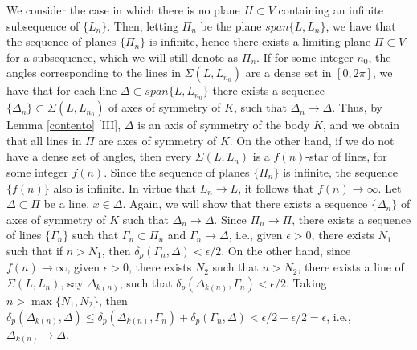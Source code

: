 \documentclass[12pt,thmsa]{amsart}
\begin{document}
 We consider the case in which there is no plane $H\subset V$ containing an infinite subsequence of $\{L_n\}$. Then, letting $\Pi_n$ be the plane $span\{L,L_{n}\}$, we have that the sequence of planes $\{\Pi_n\}$ is infinite, hence there exists a limiting plane $\Pi\subset V$ for a subsequence, which we will still denote as $\Pi_{n}$. If for some integer $n_0$, the angles corresponding to the lines in $\Sigma (L,L_{n_0})$ are a dense set in $[0,2\pi]$, we have that for each line $\Delta \subset span\{L,L_{n_0}\}$ there exists a sequence $\{\Delta_n\}\subset \Sigma (L,L_{n_0})$ of axes of symmetry of $K$, such that $\Delta_n \rightarrow \Delta$. Thus,  by Lemma \ref{contento} [III], $\Delta$ is an axis of symmetry of the body $K$, and we obtain that all lines in $\Pi$ are axes of symmetry of $K$. On the other hand, if we do not have a dense set of angles, then every  $\Sigma (L,L_n)$  is a $f(n)$-star of lines,  for some integer $f(n)$. Since the sequence of planes $\{\Pi_n\}$ is infinite, the sequence $\{f(n)\}$ also is infinite. In virtue that $L_n \rightarrow L$, it follows that $f(n) \rightarrow \infty$. %
Let  $\Delta \subset \Pi$ be  a line, $x\in \Delta$. Again, we will show that there exists a sequence $\{\Delta_n\}$ of axes of symmetry of $K$ such that $\Delta_n \rightarrow \Delta$. Since 
$\Pi_n \rightarrow \Pi$, there exists a sequence of lines $\{\Gamma_n \}$  such that $\Gamma_n \subset \Pi_ n $ and $\Gamma_n \rightarrow \Delta$, i.e.,  given $\epsilon > 0$, there exists $N_1$ such that if  
$n> N_1$, then  $\delta_p(\Gamma_n,\Delta)< \epsilon/2$. On the other hand, since $f(n) \rightarrow \infty$, given $\epsilon > 0$, there exists $N_2$ such that $n> N_2$, there exists a line of $\Sigma (L,L_n)$, say  
$\Delta_{k(n)}$, such that $\delta_p(\Delta_{k(n)}, \Gamma_n)< \epsilon/2$. Taking  
$n> \max \{N_1,N_2\}$, then 
$\delta_p(\Delta_{k(n)}, \Delta)\leq \delta_p(\Delta_{k(n)}, \Gamma_n)+ \delta_p( \Gamma_n, \Delta)< \epsilon/2 + \epsilon/2=\epsilon$, i.e., $\Delta_{k(n)} \rightarrow \Delta$. 
\end{document}
